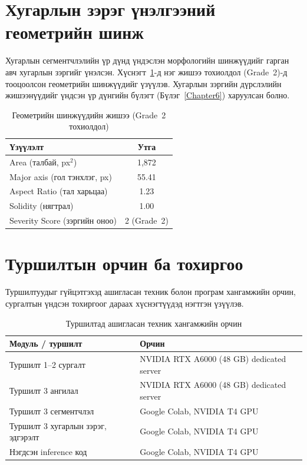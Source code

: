 \section{Хугарлын зэрэг үнэлгээний геометрийн шинж}

Хугарлын сегментчлэлийн үр дүнд үндэслэн морфологийн шинжүүдийг гарган авч хугарлын зэргийг үнэлсэн. Хүснэгт~\ref{tab:appE_geom}-д нэг жишээ тохиолдол (Grade~2)-д тооцоолсон геометрийн шинжүүдийг үзүүлэв. Хугарлын зэргийн дүрслэлийн жишээнүүдийг үндсэн үр дүнгийн бүлэгт (Бүлэг~\ref{Chapter6}) харуулсан болно.

\begin{table}[ht]
    \centering
    \begin{tabular}{|l|c|}
    \hline
    \textbf{Үзүүлэлт} & \textbf{Утга} \\ \hline
    Area (талбай, px$^2$)         & 1{,}872 \\ \hline
    Major axis (гол тэнхлэг, px)  & 55.41 \\ \hline
    Aspect Ratio (тал харьцаа)    & 1.23 \\ \hline
    Solidity (нягтрал)            & 1.00 \\ \hline
    Severity Score (зэргийн оноо) & 2 (Grade~2) \\ \hline
    \end{tabular}
    \caption{Геометрийн шинжүүдийн жишээ (Grade~2 тохиолдол)}
    \label{tab:appE_geom}
\end{table}

\section{Туршилтын орчин ба тохиргоо}

Туршилтуудыг гүйцэтгэхэд ашигласан техник болон програм хангамжийн орчин, сургалтын үндсэн тохиргоог дараах хүснэгтүүдэд нэгтгэн үзүүлэв.

\begin{table}[ht]
    \centering
    \begin{tabular}{|l|l|}
    \hline
    \textbf{Модуль / туршилт} & \textbf{Орчин} \\ \hline
    Туршилт 1--2 сургалт & NVIDIA RTX A6000 (48 GB) dedicated server \\ \hline
    Туршилт 3 ангилал & NVIDIA RTX A6000 (48 GB) dedicated server \\ \hline
    Туршилт 3 сегментчлэл & Google Colab, NVIDIA T4 GPU \\ \hline
    Туршилт 3 хугарлын зэрэг, эдгэрэлт & Google Colab, NVIDIA T4 GPU \\ \hline
    Нэгдсэн inference код & Google Colab, NVIDIA T4 GPU \\ \hline
    \end{tabular}
    \caption{Туршилтад ашигласан техник хангамжийн орчин}
    \label{tab:appH_hw}
\end{table}

